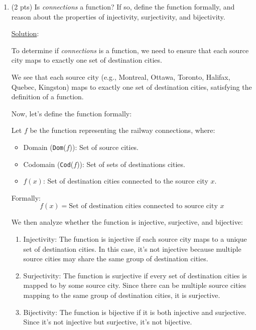 \documentclass[12pt]{article}
\begin{document}
\begin{spacing}{1.5}
\begin{enumerate}
		\item (2 pts) Is \textit{connections} a function? If so, define the function formally, and reason about the properties of injectivity, surjectivity, and bijectivity.
		      
		      \noindent \underline{Solution}:
		              
		      To determine if \textit{connections} is a function, we need to ensure that each source city maps to exactly one set of destination cities.
		      		      
		      We see that each source city (e.g., Montreal, Ottawa, Toronto, Halifax, Quebec, Kingston) maps to exactly one set of destination cities, satisfying the definition of a function.
		      		      
		      Now, let's define the function formally:
		      		      
		      Let $f$ be the function representing the railway connections, where:
		      		      
		      \begin{itemize}
		      	\item Domain (\texttt{Dom}($f$)): Set of source cities.
		      	\item Codomain (\texttt{Cod}($f$)): Set of sets of destinations cities.
		      	\item $f(x)$: Set of destination cities connected to the source city $x$.
		      \end{itemize}
		      		      
		      Formally:
		      $$f(x)=\text{Set of destination cities connected to source city }x$$
		      		      
		      We then analyze whether the function is injective, surjective, and bijective:
		      		      
		      \begin{enumerate}
		      	\item Injectivity: The function is injective if each source city maps to a unique set of destination cities. In this case, it's not injective because multiple source cities may share the same group of destination cities.
		      	\item Surjectivity: The function is surjective if every set of destination cities is mapped to by some source city. Since there can be multiple source cities mapping to the same group of destination cities, it is surjective.
		      	\item Bijectivity: The function is bijective if it is both injective and surjective. Since it's not injective but surjective, it's not bijective.
		      \end{enumerate}
		      		      

\end{enumerate}
\end{spacing}
\end{document}
